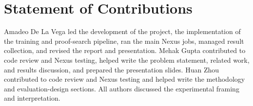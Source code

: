 \documentclass{article} %
\begin{document}
\section{Statement of Contributions}
\label{sec:contributions}

Amadeo De La Vega led the development of the project, the implementation of the training and proof-search pipeline, ran the main Nexus jobs, managed result collection, and revised the report and presentation.  Mehak Gupta contributed to code review and Nexus testing, helped write the problem statement, related work, and results discussion, and prepared the presentation slides.  Huan Zhou contributed to code review and Nexus testing and helped write the methodology and evaluation-design sections.  All authors discussed the experimental framing and interpretation.


 





\end{document}
